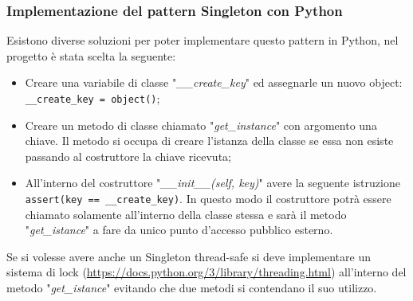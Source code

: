 \subsubsection{Implementazione del pattern Singleton con Python}\label{sec:singleton-python}
Esistono diverse soluzioni per poter implementare questo pattern in Python, nel progetto è stata scelta la seguente:
\begin{itemize}
	\item Creare una variabile di classe "\textit{\_\_create\_key}" ed assegnarle un nuovo object: \texttt{\_\_create\_key = object()};
	\item Creare un metodo di classe chiamato "\textit{get\_instance}" con argomento una chiave. Il metodo si occupa di creare l'istanza della classe se essa non esiste passando al costruttore la chiave ricevuta;
	\item All'interno del costruttore "\textit{\_\_init\_\_(self, key)}" avere la seguente istruzione \texttt{assert(key == \_\_create\_key)}. In questo modo il costruttore potrà essere chiamato solamente all'interno della classe stessa e sarà il metodo "\textit{get\_istance}" a fare da unico punto d'accesso pubblico esterno.
\end{itemize}
Se si volesse avere anche un Singleton thread-safe si deve implementare un sistema di lock (\url{https://docs.python.org/3/library/threading.html}) all'interno del metodo "\textit{get\_istance}" evitando che due metodi si contendano il suo utilizzo.

